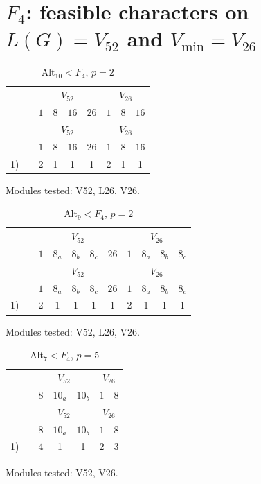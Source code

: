 \section*{$F_4$: feasible characters on $L(G) = V_{52}$ and $V_{\min} = V_{26}$}

\setcounter{table}{0}
\begin{longtable}{rc|cccc|ccc}
\caption{Alt$_{10} < F_4$, $p = 2$}\\
& & \multicolumn{4}{c|}{$V_{52}$} & \multicolumn{3}{c}{$V_{26}$} \\
& & $1$ & $8$ & $16$ & $26$ & $1$ & $8$ & $16$ \\ \hline
\endfirsthead
& & \multicolumn{4}{c|}{$V_{52}$} & \multicolumn{3}{c}{$V_{26}$} \\
& & $1$ & $8$ & $16$ & $26$ & $1$ & $8$ & $16$ \\ \hline
\endhead
1) &  & 2 & 1 & 1 & 1 & 2 & 1 & 1 \\
\end{longtable}
\noindent Modules tested: V52, L26, V26.\\

\setcounter{table}{1}
\begin{longtable}{rc|ccccc|cccc}
\caption{Alt$_{9} < F_4$, $p = 2$}\\
& & \multicolumn{5}{c|}{$V_{52}$} & \multicolumn{4}{c}{$V_{26}$} \\
& & $1$ & $8_{a}$ & $8_{b}$ & $8_{c}$ & $26$ & $1$ & $8_{a}$ & $8_{b}$ & $8_{c}$ \\ \hline
\endfirsthead
& & \multicolumn{5}{c|}{$V_{52}$} & \multicolumn{4}{c}{$V_{26}$} \\
& & $1$ & $8_{a}$ & $8_{b}$ & $8_{c}$ & $26$ & $1$ & $8_{a}$ & $8_{b}$ & $8_{c}$ \\ \hline
\endhead
1) &  & 2 & 1 & 1 & 1 & 1 & 2 & 1 & 1 & 1 \\
\end{longtable}
\noindent Modules tested: V52, L26, V26.\\

\setcounter{table}{2}
\begin{longtable}{rc|ccc|cc}
\caption{Alt$_{7} < F_4$, $p = 5$}\\
& & \multicolumn{3}{c|}{$V_{52}$} & \multicolumn{2}{c}{$V_{26}$} \\
& & $8$ & $10_{a}$ & $10_{b}$ & $1$ & $8$ \\ \hline
\endfirsthead
& & \multicolumn{3}{c|}{$V_{52}$} & \multicolumn{2}{c}{$V_{26}$} \\
& & $8$ & $10_{a}$ & $10_{b}$ & $1$ & $8$ \\ \hline
\endhead
1) &  & 4 & 1 & 1 & 2 & 3 \\
\end{longtable}
\noindent Modules tested: V52, V26.\\

